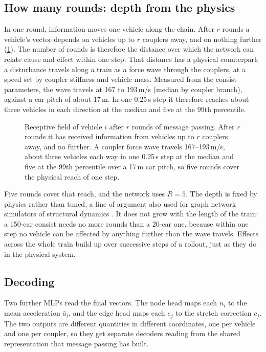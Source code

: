 \subsection{How many rounds: depth from the physics}

In one round, information moves one vehicle along the chain. After $r$ rounds a vehicle's vector depends on vehicles up to $r$ couplers away, and on nothing further (\cref{fig:arch_receptive_field}). The number of rounds is therefore the distance over which the network can relate cause and effect within one step. That distance has a physical counterpart: a disturbance travels along a train as a force wave through the couplers, at a speed set by coupler stiffness and vehicle mass. Measured from the consist parameters, the wave travels at 167 to 193\,m/s (median by coupler branch), against a car pitch of about 17\,m. In one 0.25\,s step it therefore reaches about three vehicles in each direction at the median and five at the 99th percentile.

\begin{figure}[htbp]
    \centering
    \resizebox{0.78\textwidth}{!}{}
    \caption{Receptive field of vehicle $i$ after $r$ rounds of message passing. After $r$ rounds it has received information from vehicles up to $r$ couplers away, and no further. A coupler force wave travels 167--193\,m/s, about three vehicles each way in one 0.25\,s step at the median and five at the 99th percentile over a 17\,m car pitch, so five rounds cover the physical reach of one step.}
    \label{fig:arch_receptive_field}
\end{figure}

Five rounds cover that reach, and the network uses $R = 5$. The depth is fixed by physics rather than tuned, a line of argument also used for graph network simulators of structural dynamics \cite{lucchetti2025gnss}. It does not grow with the length of the train: a 150-car consist needs no more rounds than a 20-car one, because within one step no vehicle can be affected by anything further than the wave travels. Effects across the whole train build up over successive steps of a rollout, just as they do in the physical system.

\subsection{Decoding}

Two further MLPs read the final vectors. The node head maps each $n_i$ to the mean acceleration $\bar a_i$, and the edge head maps each $e_j$ to the stretch correction $c_j$. The two outputs are different quantities in different coordinates, one per vehicle and one per coupler, so they get separate decoders reading from the shared representation that message passing has built.

